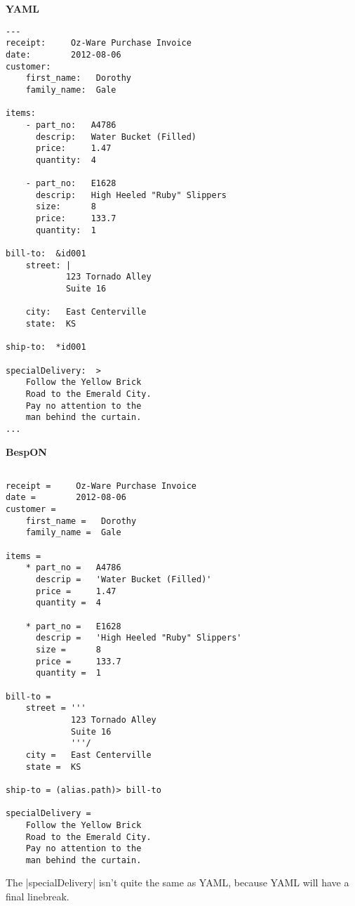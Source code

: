 \documentclass[11pt]{article}
\begin{document}
{{\begin{appendices}
\begin{tcolorbox}{}
\begin{multicols}{2}

\centering \textbf{YAML}
\begin{Verbatim}[formatcom=\color{DarkGreen}]
---
receipt:     Oz-Ware Purchase Invoice
date:        2012-08-06
customer:
    first_name:   Dorothy
    family_name:  Gale

items:
    - part_no:   A4786
      descrip:   Water Bucket (Filled)
      price:     1.47
      quantity:  4

    - part_no:   E1628
      descrip:   High Heeled "Ruby" Slippers
      size:      8
      price:     133.7
      quantity:  1

bill-to:  &id001
    street: |
            123 Tornado Alley
            Suite 16

    city:   East Centerville
    state:  KS

ship-to:  *id001

specialDelivery:  >
    Follow the Yellow Brick
    Road to the Emerald City.
    Pay no attention to the
    man behind the curtain.
...
\end{Verbatim}
\columnbreak
\centering \textbf{BespON}

\begin{Verbatim}

receipt =     Oz-Ware Purchase Invoice
date =        2012-08-06
customer =
    first_name =   Dorothy
    family_name =  Gale

items =
    * part_no =   A4786
      descrip =   'Water Bucket (Filled)'
      price =     1.47
      quantity =  4

    * part_no =   E1628
      descrip =   'High Heeled "Ruby" Slippers'
      size =      8
      price =     133.7
      quantity =  1

bill-to = 
    street = '''
             123 Tornado Alley
             Suite 16
             '''/
    city =   East Centerville
    state =  KS

ship-to = (alias.path)> bill-to

specialDelivery = 
    Follow the Yellow Brick
    Road to the Emerald City.
    Pay no attention to the
    man behind the curtain.

\end{Verbatim}
\end{multicols}
\end{tcolorbox}
The |specialDelivery| isn't quite the same as YAML, because YAML will have a final linebreak.




\end{appendices}}}
\end{document}
